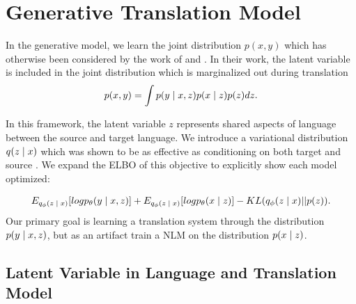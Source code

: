 \section{Generative Translation Model}

In the generative model, we learn the joint distribution $p(x, y)$ which has otherwise been considered by the work of \citet{eikema2018AEVNMT} and \citet{harshil2018GNMT}. In their work, the latent variable is included in the joint distribution which is marginalized out during translation
\begin{equation}
	p(x, y) = \int p(y \; | \;{x, z})  p(x\; | \;{z}) p(z) dz.
\end{equation}

In this framework, the latent variable $z$ represents shared aspects of language between the source and target language. We introduce a variational distribution $q( z\; | \;{x})$ which was shown to be as effective as conditioning on both target and source \cite{eikema2018AEVNMT}. We expand the \ac{ELBO} of this objective to explicitly show each model optimized:

\begin{equation}
E_{q_{\phi}(z \; | \;{x})} [ log p_{\theta}(y \; | \;{x, z})] +
E_{q_{\phi}(z \; | \;{x})} [ log p_{\theta}(x \; | \;{z})] -
	KL(q_{\phi}(z \; | \;{x}) || p(z)).
\end{equation}
Our primary goal is learning a translation system through the distribution $p(y \; | \;{x, z})$, but  as an artifact train a \ac{NLM} on the distribution $p(x \; | \;{z})$.

\subsection{Latent Variable in Language and Translation Model}


